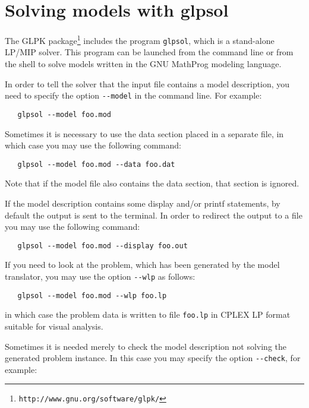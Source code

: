 \documentclass[10pt]{article}
\begin{document}

\newpage

\section{Solving models with glpsol}

The GLPK package\footnote{{\tt http://www.gnu.org/software/glpk/}}
includes the program {\tt glpsol}, which is a stand-alone LP/MIP solver.
This program can be launched from the command line or from the shell to
solve models written in the GNU MathProg modeling language.

In order to tell the solver that the input file contains a model
description, you need to specify the option \verb|--model| in the
command line. For example:

\medskip

\verb|   glpsol --model foo.mod|

\medskip

Sometimes it is necessary to use the data section placed in a separate
file, in which case you may use the following command:

\medskip

\verb|   glpsol --model foo.mod --data foo.dat|

\medskip

\noindent Note that if the model file also contains the data section,
that section is ignored.

If the model description contains some display and/or printf statements,
by default the output is sent to the terminal. In order to redirect the
output to a file you may use the following command:

\medskip

\verb|   glpsol --model foo.mod --display foo.out|

\medskip

If you need to look at the problem, which has been generated by the
model translator, you may use the option \verb|--wlp| as follows:

\medskip

\verb|   glpsol --model foo.mod --wlp foo.lp|

\medskip

\noindent in which case the problem data is written to file
\verb|foo.lp| in CPLEX LP format suitable for visual analysis.

Sometimes it is needed merely to check the model description not
solving the generated problem instance. In this case you may specify
the option \verb|--check|, for example:
\end{document}
